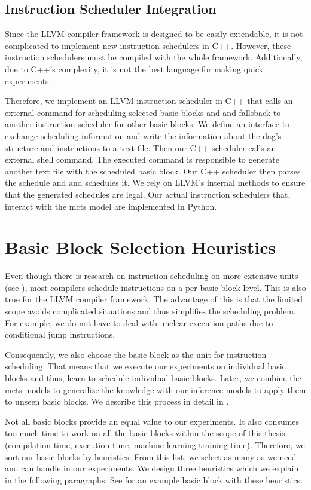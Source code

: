 \subsection{Instruction Scheduler Integration}
Since the LLVM compiler framework is designed to be easily extendable, it is not complicated to implement new instruction schedulers in C++.
However, these instruction schedulers must be compiled with the whole framework.
Additionally, due to C++'s complexity, it is not the best language for making quick experiments.

Therefore, we implement an LLVM instruction scheduler in C++ that calls an external command for scheduling selected basic blocks and and fallsback to another instruction scheduler for other basic blocks.
We define an interface to exchange scheduling information and write the information about the \ac{dag}'s structure and instructions to a text file.
Then our C++ scheduler calls an external shell command.
The executed command is responsible to generate another text file with the scheduled basic block.
Our C++ scheduler then parses the schedule and and schedules it.
We rely on LLVM's internal methods to ensure that the generated schedules are legal.
Our actual instruction schedulers that, \eg interact with the \ac{mcts} model are implemented in Python.

\section{Basic Block Selection Heuristics}
\label{sec:approach:basicblock}
Even though there is research on instruction scheduling on more extensive units (see ), most compilers schedule instructions on a per basic block level.
This is also true for the LLVM compiler framework.
The advantage of this is that the limited scope avoids complicated situations and thus simplifies the scheduling problem.
For example, we do not have to deal with unclear execution paths due to conditional jump instructions.

Consequently, we also choose the basic block as the unit for instruction scheduling.
That means that we execute our experiments on individual basic blocks and thus, learn to schedule individual basic blocks.
Later, we combine the \ac{mcts} models to generalize the knowledge with our inference models to apply them to unseen basic blocks.
We describe this process in detail in .

Not all basic blocks provide an equal value to our experiments.
It also consumes too much time to work on all the basic blocks within the scope of this thesis (\eg compilation time, execution time, machine learning training time).
Therefore, we sort our basic blocks by heuristics. 
From this list, we select as many as we need and can handle in our experiments.
We design three heuristics which we explain in the following paragraphs.
See  for an example basic block with these heuristics.


